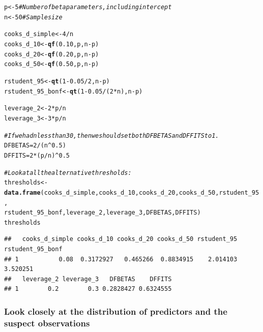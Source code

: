 \documentclass{article}\usepackage[]{graphicx}\usepackage[]{color}
\makeatletter
\newcommand{\hlnum}[1]{\textcolor[rgb]{0.686,0.059,0.569}{#1}}%
\newcommand{\hlcom}[1]{\textcolor[rgb]{0.678,0.584,0.686}{\textit{#1}}}%
\newcommand{\hlopt}[1]{\textcolor[rgb]{0,0,0}{#1}}%
\newcommand{\hlstd}[1]{\textcolor[rgb]{0.345,0.345,0.345}{#1}}%
\newcommand{\hlkwb}[1]{\textcolor[rgb]{0.69,0.353,0.396}{#1}}%
\newcommand{\hlkwd}[1]{\textcolor[rgb]{0.737,0.353,0.396}{\textbf{#1}}}%
\newenvironment{kframe}{%
 \def\at@end@of@kframe{}%
 \ifinner\ifhmode%
  \def\at@end@of@kframe{\end{minipage}}%
  \begin{minipage}{\columnwidth}%
 \fi\fi%
 \def\FrameCommand##1{\hskip\@totalleftmargin \hskip-\fboxsep
 \colorbox{shadecolor}{##1}\hskip-\fboxsep
     \hskip-\linewidth \hskip-\@totalleftmargin \hskip\columnwidth}%
 \MakeFramed {\advance\hsize-\width
   \@totalleftmargin\z@ \linewidth\hsize
   \@setminipage}}%
 {\par\unskip\endMakeFramed%
 \at@end@of@kframe}
\newenvironment{knitrout}{}{} %
\makeatother
\begin{document}
\begin{knitrout}
\color{fgcolor}\begin{kframe}
\begin{alltt}
\hlstd{p} \hlkwb{<-} \hlnum{5} \hlcom{# Number of beta parameters, including intercept}
\hlstd{n} \hlkwb{<-} \hlnum{50} \hlcom{# Sample size}

\hlstd{cooks_d_simple} \hlkwb{<-} \hlnum{4} \hlopt{/} \hlstd{n}
\hlstd{cooks_d_10} \hlkwb{<-} \hlkwd{qf}\hlstd{(}\hlnum{0.10}\hlstd{, p, n}\hlopt{-}\hlstd{p)}
\hlstd{cooks_d_20} \hlkwb{<-} \hlkwd{qf}\hlstd{(}\hlnum{0.20}\hlstd{, p, n}\hlopt{-}\hlstd{p)}
\hlstd{cooks_d_50} \hlkwb{<-} \hlkwd{qf}\hlstd{(}\hlnum{0.50}\hlstd{, p, n}\hlopt{-}\hlstd{p)}

\hlstd{rstudent_95} \hlkwb{<-} \hlkwd{qt}\hlstd{(}\hlnum{1} \hlopt{-} \hlnum{0.05}\hlopt{/}\hlnum{2}\hlstd{, n}\hlopt{-}\hlstd{p)}
\hlstd{rstudent_95_bonf} \hlkwb{<-} \hlkwd{qt}\hlstd{(}\hlnum{1} \hlopt{-} \hlnum{0.05}\hlopt{/}\hlstd{(}\hlnum{2}\hlopt{*}\hlstd{n), n}\hlopt{-}\hlstd{p)}

\hlstd{leverage_2} \hlkwb{<-} \hlnum{2} \hlopt{*} \hlstd{p}\hlopt{/}\hlstd{n}
\hlstd{leverage_3} \hlkwb{<-} \hlnum{3} \hlopt{*} \hlstd{p}\hlopt{/}\hlstd{n}

\hlcom{# If we had n less than 30, then we should set both DFBETAS and DFFITS to 1.}
\hlstd{DFBETAS} \hlkwb{=} \hlnum{2}\hlopt{/}\hlstd{(n}\hlopt{^}\hlnum{0.5}\hlstd{)}
\hlstd{DFFITS} \hlkwb{=} \hlnum{2}\hlopt{*}\hlstd{(p}\hlopt{/}\hlstd{n)}\hlopt{^}\hlnum{0.5}

\hlcom{# Look at all the alternative thresholds:}
\hlstd{thresholds} \hlkwb{<-} \hlkwd{data.frame}\hlstd{(cooks_d_simple, cooks_d_10, cooks_d_20, cooks_d_50, rstudent_95,}
                \hlstd{rstudent_95_bonf, leverage_2, leverage_3, DFBETAS, DFFITS)}
\hlstd{thresholds}
\end{alltt}
\begin{verbatim}
##   cooks_d_simple cooks_d_10 cooks_d_20 cooks_d_50 rstudent_95 rstudent_95_bonf
## 1           0.08  0.3172927   0.465266  0.8834915    2.014103         3.520251
##   leverage_2 leverage_3   DFBETAS    DFFITS
## 1        0.2        0.3 0.2828427 0.6324555
\end{verbatim}
\end{kframe}
\end{knitrout}

\newpage

\subsubsection*{Look closely at the distribution of predictors and the suspect observations}
\end{document}
